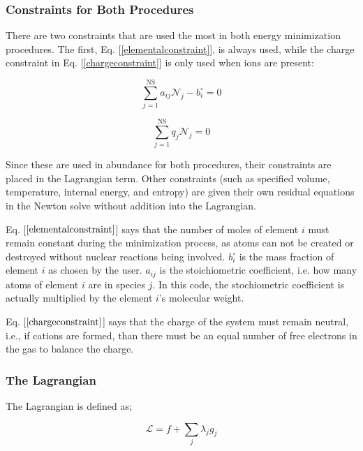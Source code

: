 \documentclass[10pt]{article}
\begin{document}
\begin{flushleft}
\subsubsection{Constraints for Both Procedures}

There are two constraints that are used the most in both energy minimization procedures. The first, Eq. [\ref{elementalconstraint}], is always used, while the charge constraint in Eq. [\ref{chargeconstraint}] is only used when ions are present:

\begin{equation}
   \sum_{j=1}^\text{NS} a_{ij} \mathcal{N}_j -  b_i^\circ= 0
    \label{elementalconstraint}
\end{equation}

\begin{equation}
    \sum_{j=1}^\text{NS}q_j \mathcal{N}_j = 0
    \label{chargeconstraint}
\end{equation}

Since these are used in abundance for both procedures, their constraints are placed in the Lagrangian term. Other constraints (such as specified volume, temperature, internal energy, and entropy) are given their own residual equations in the Newton solve without addition into the Lagrangian. 

\vspace{5mm} 

Eq. [$\ref{elementalconstraint}$] says that the number of moles of element $i$ must remain constant during the minimization process, as atoms can not be created or destroyed without nuclear reactions being involved. $b_i^\circ$ is the mass fraction of element $i$ as chosen by the user. $a_{ij}$ is the stoichiometric coefficient, i.e. how many atoms of element $i$ are in species $j$. In this code, the stochiometric coefficient is actually multiplied by the element $i$'s molecular weight.

\vspace{5mm}

Eq. [$\ref{chargeconstraint}$] says that the charge of the system must remain neutral, i.e., if cations are formed, than there must be an equal number of free electrons in the gas to balance the charge.

\subsubsection{The Lagrangian}
The Lagrangian is defined as;

\begin{equation}
    \mathcal{L} = f + \sum_j \lambda_j g_j
    \label{Lagrangian}
\end{equation}


\end{flushleft}
\end{document}
